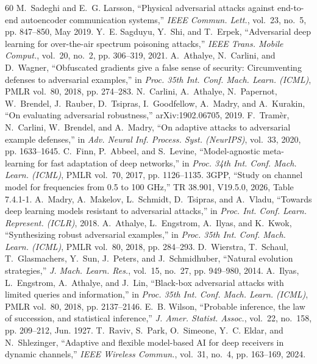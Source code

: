 \documentclass[journal]{IEEEtran}
\theoremstyle{remark}
\begin{document}
\begin{thebibliography}{60}
 M.~Sadeghi and E.~G. Larsson, ``Physical adversarial attacks against end-to-end autoencoder communication systems,'' \emph{IEEE Commun. Lett.}, vol.~23, no.~5, pp. 847--850, May 2019.
 Y.~E. Sagduyu, Y.~Shi, and T.~Erpek, ``Adversarial deep learning for over-the-air spectrum poisoning attacks,'' \emph{IEEE Trans. Mobile Comput.}, vol.~20, no.~2, pp. 306--319, 2021.
 A.~Athalye, N.~Carlini, and D.~Wagner, ``Obfuscated gradients give a false sense of security: Circumventing defenses to adversarial examples,'' in \emph{Proc. 35th Int. Conf. Mach. Learn. (ICML)}, PMLR vol.~80, 2018, pp. 274--283.
 N.~Carlini, A.~Athalye, N.~Papernot, W.~Brendel, J.~Rauber, D.~Tsipras, I.~Goodfellow, A.~Madry, and A.~Kurakin, ``On evaluating adversarial robustness,'' arXiv:1902.06705, 2019.
 F.~Tram{\`e}r, N.~Carlini, W.~Brendel, and A.~Madry, ``On adaptive attacks to adversarial example defenses,'' in \emph{Adv. Neural Inf. Process. Syst. (NeurIPS)}, vol.~33, 2020, pp. 1633--1645.
 C.~Finn, P.~Abbeel, and S.~Levine, ``Model-agnostic meta-learning for fast adaptation of deep networks,'' in \emph{Proc. 34th Int. Conf. Mach. Learn. (ICML)}, PMLR vol.~70, 2017, pp. 1126--1135.
 3GPP, ``Study on channel model for frequencies from 0.5 to 100 GHz,'' TR 38.901, V19.5.0, 2026, Table 7.4.1-1.
 A.~Madry, A.~Makelov, L.~Schmidt, D.~Tsipras, and A.~Vladu, ``Towards deep learning models resistant to adversarial attacks,'' in \emph{Proc. Int. Conf. Learn. Represent. (ICLR)}, 2018.
 A.~Athalye, L.~Engstrom, A.~Ilyas, and K.~Kwok, ``Synthesizing robust adversarial examples,'' in \emph{Proc. 35th Int. Conf. Mach. Learn. (ICML)}, PMLR vol.~80, 2018, pp. 284--293.
 D.~Wierstra, T.~Schaul, T.~Glasmachers, Y.~Sun, J.~Peters, and J.~Schmidhuber, ``Natural evolution strategies,'' \emph{J. Mach. Learn. Res.}, vol.~15, no.~27, pp. 949--980, 2014.
 A.~Ilyas, L.~Engstrom, A.~Athalye, and J.~Lin, ``Black-box adversarial attacks with limited queries and information,'' in \emph{Proc. 35th Int. Conf. Mach. Learn. (ICML)}, PMLR vol.~80, 2018, pp. 2137--2146.
 E.~B. Wilson, ``Probable inference, the law of succession, and statistical inference,'' \emph{J. Amer. Statist. Assoc.}, vol.~22, no.~158, pp. 209--212, Jun. 1927.
 T.~Raviv, S.~Park, O.~Simeone, Y.~C. Eldar, and N.~Shlezinger, ``Adaptive and flexible model-based AI for deep receivers in dynamic channels,'' \emph{IEEE Wireless Commun.}, vol.~31, no.~4, pp. 163--169, 2024.

\end{thebibliography}
\end{document}
